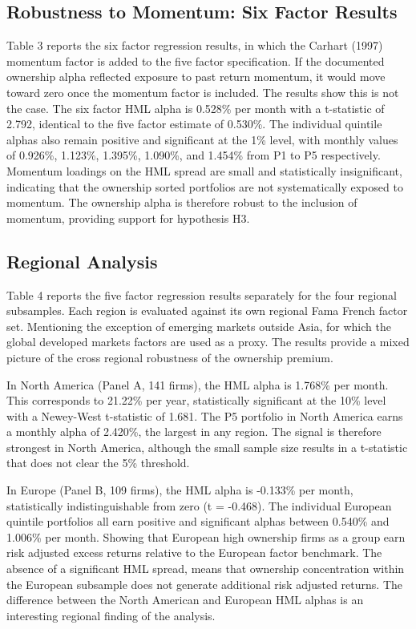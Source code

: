 \subsection{Robustness to Momentum: Six Factor Results}

Table 3 reports the six factor regression results, in which the Carhart (1997) momentum factor is added to the five factor specification. If the documented ownership alpha reflected exposure to past return momentum, it would move toward zero once the momentum factor is included. The results show this is not the case. The six factor HML alpha is 0.528\% per month with a t-statistic of 2.792, identical to the five factor estimate of 0.530\%. The individual quintile alphas also remain positive and significant at the 1\% level, with monthly values of 0.926\%, 1.123\%, 1.395\%, 1.090\%, and 1.454\% from P1 to P5 respectively. Momentum loadings on the HML spread are small and statistically insignificant, indicating that the ownership sorted portfolios are not systematically exposed to momentum. The ownership alpha is therefore robust to the inclusion of momentum, providing support for hypothesis H3.




\subsection{Regional Analysis}

Table 4 reports the five factor regression results separately for the four regional subsamples. Each region is evaluated against its own regional Fama French factor set. Mentioning the exception of emerging markets outside Asia, for which the global developed markets factors are used as a proxy. The results provide a mixed picture of the cross regional robustness of the ownership premium.

In North America (Panel A, 141 firms), the HML alpha is 1.768\% per month. This corresponds to 21.22\% per year, statistically significant at the 10\% level with a Newey-West t-statistic of 1.681. The P5 portfolio in North America earns a monthly alpha of 2.420\%, the largest in any region. The signal is therefore strongest in North America, although the small sample size results in a t-statistic that does not clear the 5\% threshold.

In Europe (Panel B, 109 firms), the HML alpha is -0.133\% per month, statistically indistinguishable from zero (t = -0.468). The individual European quintile portfolios all earn positive and significant alphas between 0.540\% and 1.006\% per month. Showing that European high ownership firms as a group earn risk adjusted excess returns relative to the European factor benchmark. The absence of a significant HML spread, means that ownership concentration within the European subsample does not generate additional risk adjusted returns. The difference between the North American and European HML alphas is an interesting regional finding of the analysis.

